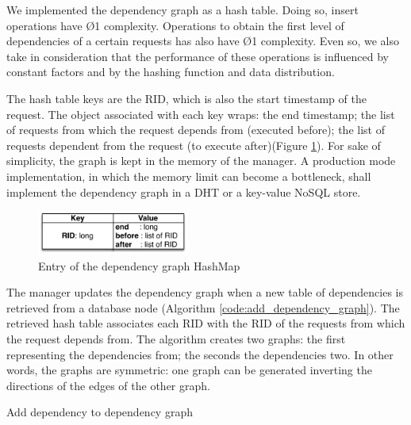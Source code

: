 We implemented the dependency graph as a hash table. Doing so, insert operations have \O{1} complexity. Operations to obtain the first level of dependencies of a certain requests has also have \O{1} complexity. Even so, we also take in consideration that the performance of these operations is influenced by constant factors and by the hashing function and data distribution.

The hash table keys are the \acf{RID}, which is also the start timestamp of the request. The object associated with each key wraps: the end timestamp; the list of requests from which the request depends from (executed before); the list of requests dependent from the request (to execute after)(Figure \ref{fig:impl:manager:graph}). For sake of simplicity, the graph is kept in the memory of the manager. A production mode implementation, in which the memory limit can become a bottleneck, shall implement the dependency graph in a \acf{DHT} or a key-value \acs{NoSQL} store.


\begin{figure}
  \centering
  \includegraphics[width=50mm]{arch/managerGraph}
  \caption{Entry of the dependency graph HashMap}
  \label{fig:impl:manager:graph}
\end{figure}


The manager updates the dependency graph when a new table of dependencies is retrieved from a database node (Algorithm \ref{code:add_dependency_graph}). The retrieved hash table associates each \acf{RID} with the \ac{RID} of the requests from which the request depends from. The algorithm creates two graphs: the first representing the dependencies from; the seconds the dependencies two. In other words, the graphs are symmetric: one graph can be generated inverting the directions of the edges of the other graph.

 \begin{algorithm}[H]
 \DontPrintSemicolon{}
 	\;
 	\BlankLine
 	\caption{Add dependency to dependency graph}
	\label{code:add_dependency_graph}
\end{algorithm}

